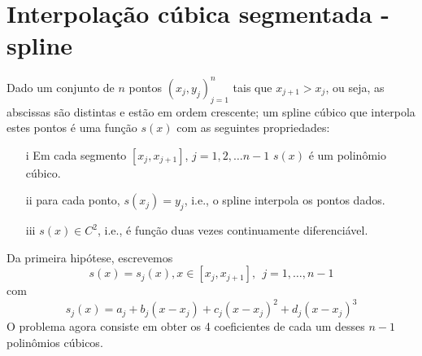 \section{Interpolação cúbica segmentada - spline}
Dado um conjunto de $n$ pontos $\left(x_j,y_j\right)_{j=1}^n$ tais que $x_{j+1}>x_j$, ou seja, as abscissas são distintas e estão em ordem crescente; um spline cúbico que interpola estes pontos é uma função $s(x)$ com as seguintes propriedades:
\begin{itemize}
\item[i] Em cada segmento $[x_j,x_{j+1}]$, $j=1,2,\ldots n-1$ $s(x)$ é um polinômio cúbico.
\item[ii] para cada ponto, $s(x_j)=y_j$, i.e., o spline interpola os pontos dados.
\item[iii] $s(x)\in C^2$, i.e., é função duas vezes continuamente diferenciável.
\end{itemize}

Da primeira hipótese, escrevemos
$$s(x)=s_j(x),x \in [x_j,x_{j+1}],~~ j=1,\ldots, n-1$$
com
$$s_j(x)=a_j+b_j(x-x_j)+c_j(x-x_j)^2+d_j(x-x_j)^3$$
O problema agora consiste em obter os 4 coeficientes de cada um desses $n-1$ polinômios cúbicos.

